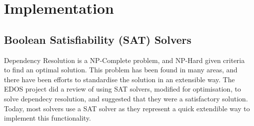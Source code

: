 \chapter{Implementation}
\label{implementation}









\section{Boolean Satisfiability (SAT) Solvers}

Dependency Resolution is a NP-Complete problem, and NP-Hard given criteria to find an optimal solution.
This problem has been found in many areas, and there have been efforts to standardise the solution in an extensible way.
The EDOS project did a review of using SAT solvers, modified for optimisation, to solve dependecy resolution, and suggested that they were a satisfactory solution.
Today, most solvers use a SAT solver as they represent a quick extendible way to implement this functionality.

